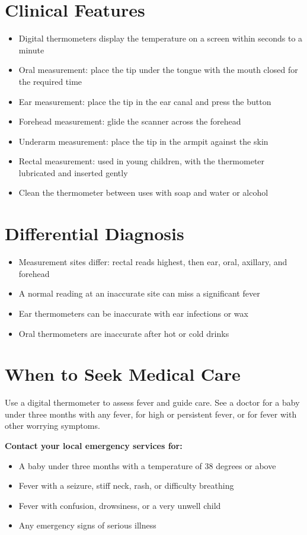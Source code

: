 \section*{Clinical Features}
\begin{itemize}
    \item Digital thermometers display the temperature on a screen within seconds to a minute
    \item Oral measurement: place the tip under the tongue with the mouth closed for the required time
    \item Ear measurement: place the tip in the ear canal and press the button
    \item Forehead measurement: glide the scanner across the forehead
    \item Underarm measurement: place the tip in the armpit against the skin
    \item Rectal measurement: used in young children, with the thermometer lubricated and inserted gently
    \item Clean the thermometer between uses with soap and water or alcohol
\end{itemize}

\section*{Differential Diagnosis}
\begin{itemize}
    \item Measurement sites differ: rectal reads highest, then ear, oral, axillary, and forehead
    \item A normal reading at an inaccurate site can miss a significant fever
    \item Ear thermometers can be inaccurate with ear infections or wax
    \item Oral thermometers are inaccurate after hot or cold drinks
\end{itemize}

\section*{When to Seek Medical Care}
Use a digital thermometer to assess fever and guide care. See a doctor for a baby under three months with any fever, for high or persistent fever, or for fever with other worrying symptoms.

\textbf{Contact your local emergency services for:}
\begin{itemize}
    \item A baby under three months with a temperature of 38 degrees or above
    \item Fever with a seizure, stiff neck, rash, or difficulty breathing
    \item Fever with confusion, drowsiness, or a very unwell child
    \item Any emergency signs of serious illness
\end{itemize}


